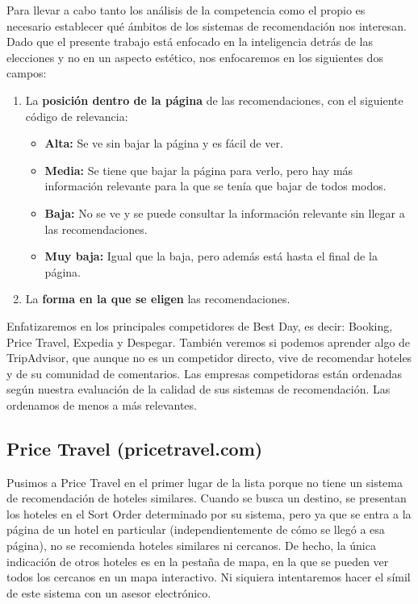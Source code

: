 \documentclass[12pt]{report}
\begin{document}
Para llevar a cabo tanto los análisis de la competencia como el propio es necesario establecer qué ámbitos de los sistemas de recomendación nos interesan. Dado que el presente trabajo está enfocado en la inteligencia detrás de las elecciones y no en un aspecto estético, nos enfocaremos en los siguientes dos campos:
\begin{enumerate}
	\item La \textbf{posición dentro de la página} de las recomendaciones, con el siguiente código de relevancia:
		\begin{itemize}
			\item \textbf{Alta:} Se ve sin bajar la página y es fácil de ver.
			\item \textbf{Media:} Se tiene que bajar la página para verlo, pero hay más información relevante para la que se tenía que bajar de todos modos.
			\item \textbf{Baja:} No se ve y se puede consultar la información relevante sin llegar a las recomendaciones.
			\item \textbf{Muy baja:} Igual que la baja, pero además está hasta el final de la página.
		\end{itemize}
	\item La \textbf{forma en la que se eligen} las recomendaciones.
\end{enumerate}

Enfatizaremos en los principales competidores de Best Day, es decir: Booking, Price Travel, Expedia y Despegar. También veremos si podemos aprender algo de TripAdvisor, que aunque no es un competidor directo, vive de recomendar hoteles y de su comunidad de comentarios. Las empresas competidoras están ordenadas según nuestra evaluación de la calidad de sus sistemas de recomendación. Las ordenamos de menos a más relevantes.

\subsection*{Price Travel (pricetravel.com)}

Pusimos a Price Travel en el primer lugar de la lista porque no tiene un sistema de recomendación de hoteles similares. Cuando se busca un destino, se presentan los hoteles en el Sort Order determinado por su sistema, pero ya que se entra a la página de un hotel en particular (independientemente de cómo se llegó a esa página), no se recomienda hoteles similares ni cercanos. De hecho, la única indicación de otros hoteles es en la pestaña de mapa, en la que se pueden ver todos los cercanos en un mapa interactivo. Ni siquiera intentaremos hacer el símil de este sistema con un asesor electrónico.
\end{document}
